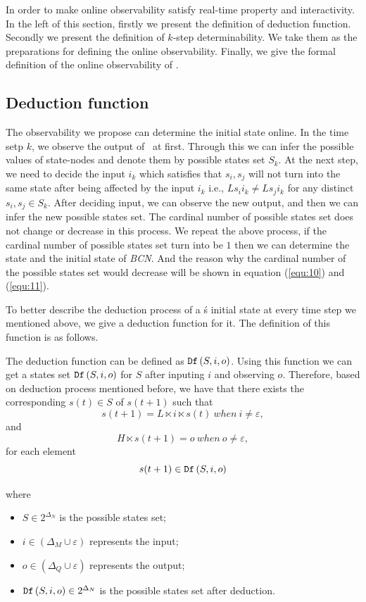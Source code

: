 In order to make online observability satisfy real-time property and interactivity. In the left of this section, firstly we present the definition of deduction function. Secondly we present the definition of $k$-step determinability. We take them as the preparations for defining the online observability. Finally, we give the formal definition of the online observability of \BCNs. 
\subsection{Deduction function}
The observability we propose can determine the initial state online.
 In the time setp $k$, we observe the output of \BCNs\ at first. Through this we can infer the possible values of state-nodes and denote them by possible states set $S_k$. %
 At the next step, we need to decide the input $i_k$ which satisfies that %
$s_i, s_j$ 
 will not turn into the same state after being affected by the input $i_k$ i.e., $Ls_i i_k\neq Ls_j i_k$ for any distinct $s_i, s_j\in S_k$. After deciding input, we can observe the new output, and then we can infer the new possible states set. The cardinal number of possible states set does not change or decrease in this process. We repeat the above process, if the cardinal number of possible states set turn into be $1$ then we can determine the state and the initial state of {\em BCN}. And the reason why the cardinal number of the possible states set would decrease will be shown in equation (\ref{equ:10}) and (\ref{equ:11}). 
 
To better describe the deduction process of a \BCN\'s initial state at every time step we mentioned above, we give a deduction function for it. The definition of this function is as follows.
\begin{definition} The deduction function can be defined as ${\tt Df}\left(S, i, o\right)$. Using this function we can get a states set ${\tt Df}\left(S, i, o\right)$ for $S$ after inputing $i$ and observing $o$. Therefore, based on deduction process mentioned before, we have that there exists the corresponding $s(t)\in S$ of $s(t+1)$ such that \[s(t+1)=L\ltimes i\ltimes s(t)\ when\ i\neq \varepsilon, \] and \[H\ltimes s(t+1)=o\ when\ o\neq \varepsilon, \]
for each element \[s(t+1)\in {\tt Df}\left(S, i, o\right)\]
\end{definition}
where   
\begin{itemize}
  \item $S\in 2^{\Delta_N}$ is the possible states set;
  \item $i\in (\Delta_M\cup\varepsilon)$ represents the input;
  \item $o\in(\Delta_Q\cup\varepsilon)$ represents the output; 
  \item ${\tt Df}\left(S, i, o\right)\in 2^{\Delta_N}$ is the possible states set after deduction.
\end{itemize} 
 
